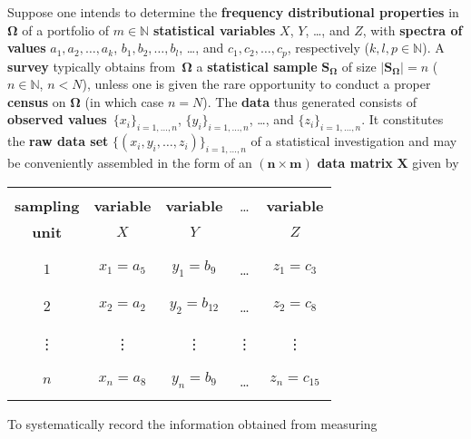 \medskip
\noindent
Suppose one intends to determine the \textbf{frequency
distributional properties} in $\boldsymbol{\Omega}$ of a portfolio
of $m \in \mathbb{N}$ \textbf{statistical variables} $X$, $Y$,
\ldots, and $Z$, with \textbf{spectra of values} $a_{1}, a_{2},
\ldots, a_{k}$, $b_{1}, b_{2}, \ldots, b_{l}$, \ldots, and $c_{1},
c_{2}, \ldots, c_{p}$, respectively ($k,l,p \in \mathbb{N}$). A
\textbf{survey} typically obtains from~$\boldsymbol{\Omega}$ a
\textbf{statistical sample} $\boldsymbol{S_{\Omega}}$ of size 
$|\boldsymbol{S_{\Omega}}|=n$ ($n \in \mathbb{N}$, $n < N$), 
unless one is given the rare opportunity to conduct a proper
\textbf{census} on $\boldsymbol{\Omega}$ (in which case $n=N$).
The \textbf{data} thus generated consists of \textbf{observed 
values}~$\{x_{i}\}_{i=1,\ldots,n}$, 
$\{y_{i}\}_{i=1,\ldots,n}$, \ldots, and $\{z_{i}\}_{i=1,\ldots,n}$.
It constitutes the \textbf{raw data set} $\{(x_{i}, y_{i}, \ldots, 
z_{i})\}_{i=1,\ldots,n}$ of a statistical investigation and may be 
conveniently assembled in the form of an $\boldsymbol{(n \times 
m)}$ \textbf{data matrix} $\boldsymbol{X}$ given by
%
\begin{center}
\begin{tabular}[h]{|c||c|c|c|c|}
\hline
 & & & & \\
\textbf{sampling} & \textbf{variable} & \textbf{variable} &
\ldots & \textbf{variable} \\
\textbf{unit} & $X$ & $Y$ & & $Z$ \\
 & & & & \\
\hline\hline
 & & & & \\
$1$ & $x_{1}=a_{5}$ & $y_{1}=b_{9}$ & \ldots & $z_{1}=c_{3}$ \\
 & & & & \\
\hline
 & & & & \\
$2$ & $x_{2}=a_{2}$ & $y_{2}=b_{12}$ & \ldots & $z_{2}=c_{8}$ \\
 & & & & \\
\hline
 & & & & \\
\vdots & \vdots & \vdots & \vdots & \vdots \\
 & & & & \\
\hline
 & & & & \\
$n$ & $x_{n}=a_{8}$ & $y_{n}=b_{9}$ & \ldots & $z_{n}=c_{15}$ \\
 & & & & \\
\hline
\end{tabular}
\end{center}
%
To systematically record the information obtained from measuring 
